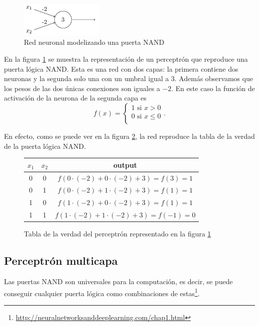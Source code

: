 \documentclass{article}
\begin{document}

\begin{figure}[htbp]
\centering
\includegraphics[width=4cm]{imagenes/NAND.png}
\caption{Red neuronal modelizando una puerta NAND}
\label{fig:red_nand}
\end{figure}
En la figura \ref{fig:red_nand} se muestra la representación de un perceptrón que reproduce una puerta lógica NAND.
Esta es una red con dos capas: la primera contiene dos neuronas y la segunda solo una con un umbral igual a $3$. Además observamos que los pesos de las dos únicas conexiones son iguales a $-2$. En este caso la función de activación de la neurona de la segunda capa es 
$$f(x)=\begin{cases}
1 \text{ si } x>0\\
0 \text{ si } x\leq 0\\
\end{cases}.$$

En efecto, como se puede ver en la figura \ref{fig:tabla_verdad}, la red reproduce la tabla de la verdad de la puerta lógica NAND.\\
\begin{figure}[htbp]
\centering
\begin{tabular}{ |c|c|c| } 
 $x_1$ & $x_2$ & output \\ 
 \hline
 0 & 0 & $f(0\cdot (-2)+0\cdot (-2)+3)=f(3)=1$ \\ 
 0 & 1 & $f(0\cdot (-2)+1\cdot (-2)+3)=f(1)=1$ \\ 
 1 & 0 & $f(1\cdot (-2)+0\cdot (-2)+3)=f(1)=1$ \\ 
 1 & 1 & $f(1\cdot (-2)+1\cdot (-2)+3)=f(-1)=0$ 
\end{tabular}
\caption{Tabla de la verdad del perceptrón representado en la figura \ref{fig:red_nand}}
\label{fig:tabla_verdad}
\end{figure}



\subsection{Perceptrón multicapa}
Las puertas NAND son universales para la computación, es decir, se puede conseguir cualquier puerta lógica como combinaciones de estas\footnote{\url{http://neuralnetworksanddeeplearning.com/chap1.html}}.
\end{document}
